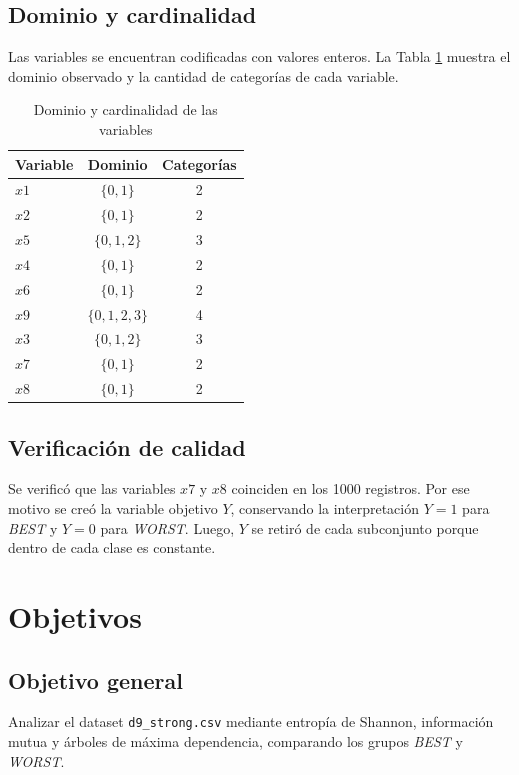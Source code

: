 \documentclass[12pt,a4paper]{article}
\begin{document}
\subsection{Dominio y cardinalidad}

Las variables se encuentran codificadas con valores enteros. La Tabla \ref{tab:dominios} muestra el dominio observado y la cantidad de categorías de cada variable.

\begin{table}[H]
\centering
\caption{Dominio y cardinalidad de las variables}
\label{tab:dominios}
\begin{tabular}{lcc}
\toprule
\textbf{Variable} & \textbf{Dominio} & \textbf{Categorías} \\
\midrule
\(x1\) & \(\{0,1\}\) & 2 \\
\(x2\) & \(\{0,1\}\) & 2 \\
\(x5\) & \(\{0,1,2\}\) & 3 \\
\(x4\) & \(\{0,1\}\) & 2 \\
\(x6\) & \(\{0,1\}\) & 2 \\
\(x9\) & \(\{0,1,2,3\}\) & 4 \\
\(x3\) & \(\{0,1,2\}\) & 3 \\
\(x7\) & \(\{0,1\}\) & 2 \\
\(x8\) & \(\{0,1\}\) & 2 \\
\bottomrule
\end{tabular}
\end{table}

\subsection{Verificación de calidad}

Se verificó que las variables \(x7\) y \(x8\) coinciden en los 1000 registros. Por ese motivo se creó la variable objetivo \(Y\), conservando la interpretación \(Y=1\) para \textit{BEST} y \(Y=0\) para \textit{WORST}. Luego, \(Y\) se retiró de cada subconjunto porque dentro de cada clase es constante.

\section{Objetivos}

\subsection{Objetivo general}

Analizar el dataset \texttt{d9\_strong.csv} mediante entropía de Shannon, información mutua y árboles de máxima dependencia, comparando los grupos \textit{BEST} y \textit{WORST}.
\end{document}
